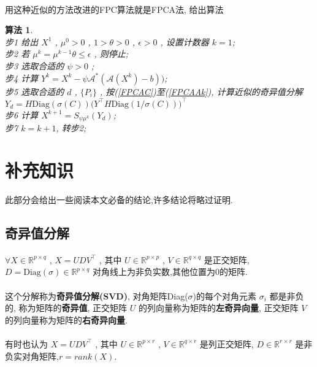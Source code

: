 \documentclass[UTF8]{ctexart}
\newtheorem{algo}{\bf 算法}
\renewcommand{\b}{\textbf}
\newcommand{\Real}[1]{\mathbb{R}^{#1}}
\numberwithin{equation}{section}
\begin{document}
			\paragraph{}
				\quad 用这种近似的方法改进的FPC算法就是FPCA法, 给出算法
				\begin{algo}
					\quad\\
					步1 \quad 给出 $X^1$ , $\mu^0 > 0$ , $1 > \theta > 0$ , $\epsilon > 0$ , 设置计数器 $k = 1$;\\
					步2 \quad 若 $\mu^k = \mu^{k -1} \theta \le \epsilon$ , 则停止;\\
					步3 \quad 选取合适的 $\psi > 0$ ;\\
					步4 \quad 计算 $Y^k = X^k - \psi \mathcal{A}^*(\mathcal{A}(X^k) - b))$;\\
					步5 \quad 选取合适的 $d$ , $\{P_i\}$ , 按(\ref{FPCAC})至(\ref{FPCAAk}), 计算近似的奇异值分解 $Y_d = H \text{Diag}(\sigma(C)) \big(Y ^\top H \text{Diag}(1/\sigma(C))\big)^\top$\\
					步6 \quad 计算 $X^{k + 1} = S_{\psi \mu^k}(Y_d)$;\\
					步7 \quad $k = k + 1$, 转步2;
				\end{algo}
		


		
	\section{补充知识}
		此部分会给出一些阅读本文必备的结论,许多结论将略过证明.
		\subsection{奇异值分解}
			\paragraph{}
				\quad $\forall X \in \Real{p \times q}$ , $X = U D V^\top$ , 其中 $U \in \Real{p \times p}$ , $V \in \Real{q \times q}$ 是正交矩阵, $ D = \text{Diag}(\sigma) \in \Real{p \times q}$ 对角线上为非负实数,其他位置为0的矩阵.

			\paragraph{}
				\quad 这个分解称为\b{奇异值分解(SVD)}, 对角矩阵Diag($\sigma$)的每个对角元素 $\sigma_i$ 都是非负的, 称为矩阵的\b{奇异值}, 正交矩阵 $U$ 的列向量称为矩阵的\b{左奇异向量}, 正交矩阵 $V$ 的列向量称为矩阵的\b{右奇异向量}.

			\paragraph{}
				\quad 有时也认为 $X = U D V^\top$ , 其中 $U \in \Real{p \times r}$ , $V \in \Real{q \times r}$ 是列正交矩阵, $D \in \Real{r \times r}$ 是非负实对角矩阵,$r = rank(X)$.
\end{document}
